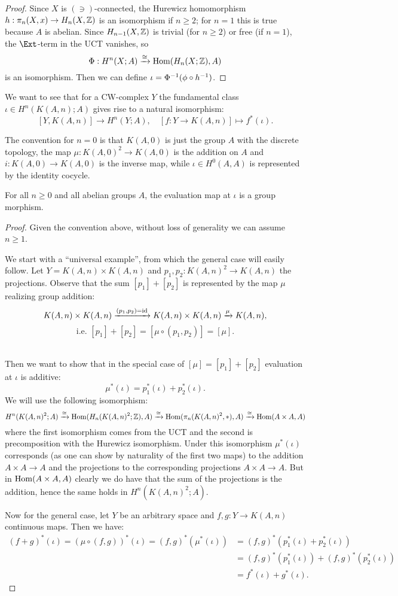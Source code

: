 \begin{proof}
Since $X$ is $(\ni)$-connected, the Hurewicz homomorphism $h:\pi_n(X,x)\to H_n(X,{\mathbb Z})$ is an isomorphism if $n\ge2$; for $n=1$ this is true because $A$ is abelian. Since $H_{n-1}(X,{\mathbb Z})$ is trivial (for $n\ge2$) or free (if $n=1$), the $\Ext$-term in the UCT vanishes, so
\[\Phi:H^n(X;A)\xrightarrow{\cong}\operatorname{Hom}(H_n(X;{\mathbb Z}),A)\]
is an isomorphism. Then we can define $\iota=\Phi^\inv(\phi\circ h^\inv)$.
\end{proof}

We want to see that for a CW-complex $Y$ the fundamental class $\iota\in H^n(K(A,n);A)$ gives rise to a natural isomorphism:
\[
[Y,K(A,n)]\to H^n(Y;A),\quad [f:Y\to K(A,n)]\mapsto f^*(\iota).
\]

The convention for $n=0$ is that $K(A,0)$ is just the group $A$ with the discrete topology, the map $\mu:K(A,0)^2\to K(A,0)$ is the addition on $A$ and $i: K(A,0)\to K(A,0)$ is the inverse map, while $\iota\in H^0(A,A)$ is represented by the identity cocycle.

\begin{theorem}
For all $n\ge0$ and all abelian groups $A$, the evaluation map at $\iota$ is a group morphism.
\end{theorem}

\begin{proof}
Given the convention above, without loss of generality we can assume $n\ge1$.

We start with a \enquote{universal example}, from which the general case will easily follow. Let $Y=K(A,n)\times K(A,n)$ and $p_1,p_2:K(A,n)^2\to K(A,n)$ the projections. Observe that the sum $[p_1]+[p_2]$ is represented by the map $\mu$ realizing group addition:
\[
K(A,n)\times K(A,n)\xrightarrow{(p_1,p_2)=\operatorname{id}}K(A,n)\times K(A,n)\xrightarrow{\mu}K(A,n),\]
\[\text{i.e. } [p_1]+[p_2]=[\mu\circ(p_1,p_2)]=[\mu].
\]\ 

Then we want to show that in the special case of $[\mu]=[p_1]+[p_2]$ evaluation at $\iota$ is additive:
\[\mu^*(\iota)=p_1^*(\iota)+p_2^*(\iota).\]
We will use the following isomorphism:
{\small
\[ H^n(K(A,n)^2;A)\xrightarrow{\cong}\operatorname{Hom}(H_n(K(A,n)^2;{\mathbb Z}),A)\xrightarrow{\cong}\operatorname{Hom}(\pi_n(K(A,n)^2,*),A)\xrightarrow{\cong}\operatorname{Hom}(A\times A,A)\]}where the first isomorphism comes from the UCT and the second is precomposition with the Hurewicz isomorphism. Under this isomorphism $\mu^*(\iota)$ corresponds (as one can show by naturality of the first two maps) to the addition $A\times A\to A$ and the projections to the corresponding projections $A\times A\to A$. But in $\operatorname{Hom}(A\times A,A)$ clearly we do have that the sum of the projections is the addition, hence the same holds in $H^n(K(A,n)^2;A)$.

Now for the general case, let $Y$ be an arbitrary space and $f,g:Y\to K(A,n)$ continuous maps. Then we have:
\begin{align*}
(f+g)^*(\iota)=(\mu\circ(f,g))^*(\iota)=(f,g)^*(\mu^*(\iota))&=(f,g)^*(p_1^*(\iota)+p_2^*(\iota))\\
&=(f,g)^*(p_1^*(\iota))+(f,g)^*(p_2^*(\iota))\\
&=f^*(\iota)+g^*(\iota).
\end{align*}
\end{proof}

